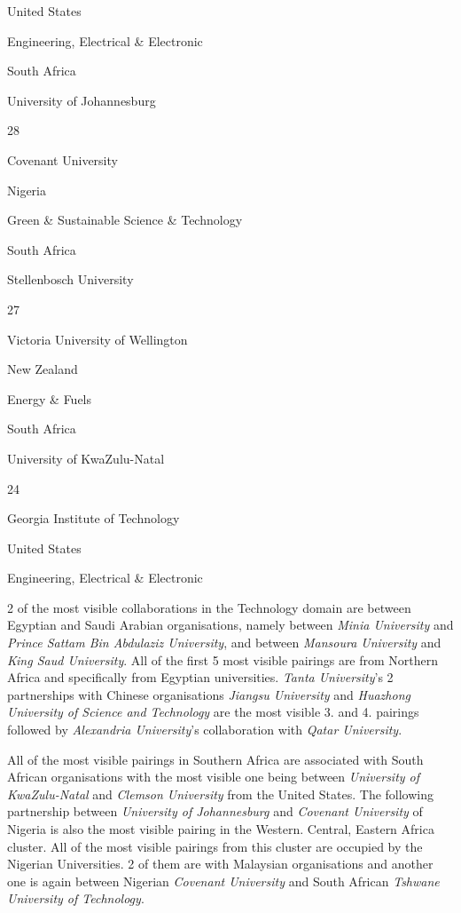 \documentclass[
]{book}
\begin{document}
{United States}

{Engineering, Electrical \& Electronic }

{South Africa}

{University of Johannesburg }

{28}

{Covenant University }

{Nigeria }

{Green \& Sustainable Science \& Technology}

{South Africa}

{Stellenbosch University }

{27}

{Victoria University of Wellington }

{New Zealand }

{Energy \& Fuels }

{South Africa}

{University of KwaZulu-Natal }

{24}

{Georgia Institute of Technology }

{United States}

{Engineering, Electrical \& Electronic }

2 of the most visible collaborations in the Technology domain are between Egyptian and Saudi Arabian organisations, namely between \emph{Minia University} and \emph{Prince Sattam Bin Abdulaziz University}, and between \emph{Mansoura University} and \emph{King Saud University}. All of the first 5 most visible pairings are from Northern Africa and specifically from Egyptian universities. \emph{Tanta University}'s 2 partnerships with Chinese organisations \emph{Jiangsu University} and \emph{Huazhong University of Science and Technology} are the most visible 3. and 4. pairings followed by \emph{Alexandria University}'s collaboration with \emph{Qatar University}.

All of the most visible pairings in Southern Africa are associated with South African organisations with the most visible one being between \emph{University of KwaZulu-Natal} and \emph{Clemson University} from the United States. The following partnership between \emph{University of Johannesburg} and \emph{Covenant University} of Nigeria is also the most visible pairing in the Western. Central, Eastern Africa cluster. All of the most visible pairings from this cluster are occupied by the Nigerian Universities. 2 of them are with Malaysian organisations and another one is again between Nigerian \emph{Covenant University} and South African \emph{Tshwane University of Technology}.
\end{document}
